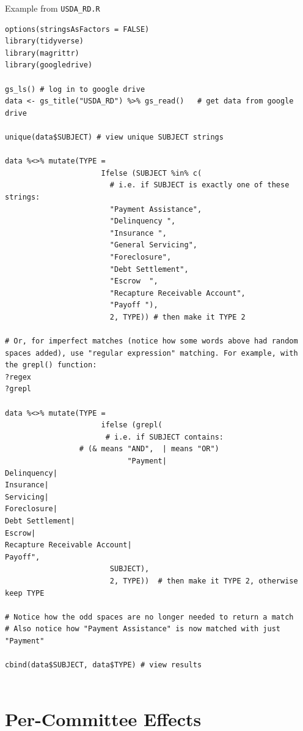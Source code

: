 \documentclass{article}
\begin{document}
Example from {\tt USDA\_RD.R}
\begin{verbatim}
options(stringsAsFactors = FALSE)
library(tidyverse)
library(magrittr)
library(googledrive)

gs_ls() # log in to google drive
data <- gs_title("USDA_RD") %>% gs_read()   # get data from google drive

unique(data$SUBJECT) # view unique SUBJECT strings

data %<>% mutate(TYPE =
                      Ifelse (SUBJECT %in% c(
                        # i.e. if SUBJECT is exactly one of these strings:
                        "Payment Assistance",
                        "Delinquency ",
                        "Insurance ", 
                        "General Servicing",
                        "Foreclosure",
                        "Debt Settlement",
                        "Escrow  ",
                        "Recapture Receivable Account",
                        "Payoff "), 
                        2, TYPE)) # then make it TYPE 2

# Or, for imperfect matches (notice how some words above had random spaces added), use "regular expression" matching. For example, with the grepl() function:
?regex
?grepl
                    
data %<>% mutate(TYPE =
                      ifelse (grepl(
                       # i.e. if SUBJECT contains:
				 # (& means "AND",  | means "OR")
                        	"Payment|
Delinquency|
Insurance|
Servicing|
Foreclosure|
Debt Settlement|
Escrow|
Recapture Receivable Account|
Payoff", 
                        SUBJECT), 
                        2, TYPE))  # then make it TYPE 2, otherwise keep TYPE

# Notice how the odd spaces are no longer needed to return a match
# Also notice how "Payment Assistance" is now matched with just "Payment"

cbind(data$SUBJECT, data$TYPE) # view results


\end{verbatim}


\section{Per-Committee Effects}


\begin{footnotesize}

\end{footnotesize}

\begin{footnotesize}

\end{footnotesize}

\begin{footnotesize}

\end{footnotesize}
\end{document}

